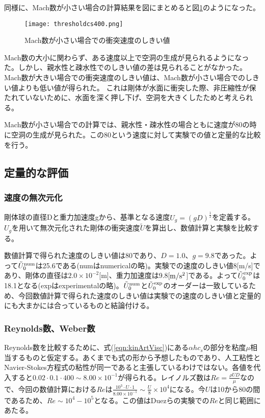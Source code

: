 \documentclass[]{jsarticle}
\begin{document}
同様に、Mach数が小さい場合の計算結果を図にまとめると図\ref{fig:threscs400}のようになった。
 \begin{figure}[H]
  \centering
  \texttt{[image: thresholdcs400.png]}
  \caption{Mach数が小さい場合での衝突速度のしきい値
    \label{fig:threscs400} }
\end{figure}

Mach数の大小に関わらず、ある速度以上で空洞の生成が見られるようになった。しかし、親水性と疎水性でのしきい値の差は見られることがなかった。
Mach数が大きい場合での衝突速度のしきい値は、Mach数が小さい場合でのしきい値よりも低い値が得られた。
これは剛体が水面に衝突した際、非圧縮性が保たれていないために、水面を深く押し下げ、空洞を大きくしたためと考えられる。


Mach数が小さい場合での計算では、親水性・疎水性の場合ともに速度が80の時に空洞の生成が見られた。この80という速度に対して実験での値と定量的な比較を行う。

\subsection{定量的な評価}
\label{subsec:discQuantitative}
\subsubsection{速度の無次元化}
剛体球の直径Dと重力加速度gから、基準となる速度$U_g=\left( gD \right)^{\frac{1}{2}}$を定義する。$U_g$を用いて無次元化された剛体の衝突速度$\tilde{U}$を算出し、数値計算と実験を比較する。


数値計算で得られた速度のしきい値は80であり、$D=1.0$、$g=9.8$であった。よって$\tilde{U}_0^{\rm{num}}$は25.6である(numはnumericalの略)。実験での速度のしきい値8[m/s]であり、剛体の直径は$2.0\times 10^{-2}$[m]、重力加速度は9.8[$\rm{m/s^2}$]である。よって$\tilde{U}_0^{\rm{exp}}$は18.1となる(expはexperimentalの略)。$\tilde{U}_0^{\rm{num}}$と$\tilde{U}_0^{\rm{exp}}$のオーダーは一致しているため、今回数値計算で得られた速度のしきい値は実験での速度のしきい値と定量的にも大まかには合っているものと結論付ける。

\subsubsection{Reynolds数、Weber数}
Reynolds数を比較するために、式(\ref{eqn:kinArtVisc})にある$\alpha h c_s$の部分を粘度$\mu$相当するものと仮定する。あくまでも式の形から予想したものであり、人工粘性とNavier-Stokes方程式の粘性が同一であると主張しているわけではない。各値を代入すると$0.02\cdot 0.1 \cdot 400 \sim 8.00\times 10^{-1}$が得られる。レイノルズ数は$Re=\frac{\rho U D}{\mu}$なので、今回の数値計算における$Re$は$\frac{10^3\cdot U \cdot 1}{8.00\times10^{-1}}\sim \frac{U}{8}\times10^4$になる。今$U$は10から80の間であるため、$Re\sim 10^4-10^5$となる。この値はDuezらの実験での$Re$と同じ範囲にあたる。
\end{document}
